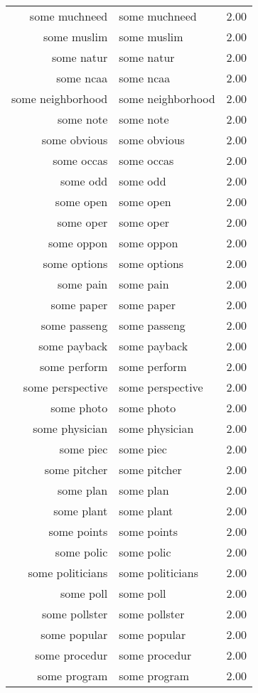 \begin{table}[ht]
\begin{tabular}{rlr}
  some muchneed & some muchneed & 2.00 \\ 
  some muslim & some muslim & 2.00 \\ 
  some natur & some natur & 2.00 \\ 
  some ncaa & some ncaa & 2.00 \\ 
  some neighborhood & some neighborhood & 2.00 \\ 
  some note & some note & 2.00 \\ 
  some obvious & some obvious & 2.00 \\ 
  some occas & some occas & 2.00 \\ 
  some odd & some odd & 2.00 \\ 
  some open & some open & 2.00 \\ 
  some oper & some oper & 2.00 \\ 
  some oppon & some oppon & 2.00 \\ 
  some options & some options & 2.00 \\ 
  some pain & some pain & 2.00 \\ 
  some paper & some paper & 2.00 \\ 
  some passeng & some passeng & 2.00 \\ 
  some payback & some payback & 2.00 \\ 
  some perform & some perform & 2.00 \\ 
  some perspective & some perspective & 2.00 \\ 
  some photo & some photo & 2.00 \\ 
  some physician & some physician & 2.00 \\ 
  some piec & some piec & 2.00 \\ 
  some pitcher & some pitcher & 2.00 \\ 
  some plan & some plan & 2.00 \\ 
  some plant & some plant & 2.00 \\ 
  some points & some points & 2.00 \\ 
  some polic & some polic & 2.00 \\ 
  some politicians & some politicians & 2.00 \\ 
  some poll & some poll & 2.00 \\ 
  some pollster & some pollster & 2.00 \\ 
  some popular & some popular & 2.00 \\ 
  some procedur & some procedur & 2.00 \\ 
  some program & some program & 2.00 \\ 

\end{tabular}
\end{table}
